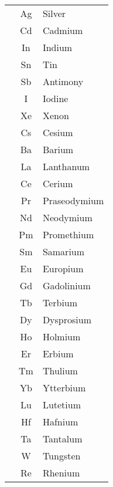 \documentclass{article}
\begin{document}
\begin{table}[h!]
\begin{minipage}{0.33\textwidth}
\begin{tabular}{>{\Rownum}ccl}
			             & Ag           & Silver           \\
			             & Cd           & Cadmium          \\
			             & In           & Indium           \\
			             & Sn           & Tin              \\
			             & Sb           & Antimony         \\
			             & I            & Iodine           \\
			             & Xe           & Xenon            \\
			             & Cs           & Cesium           \\
			             & Ba           & Barium           \\
			             & La           & Lanthanum        \\
			             & Ce           & Cerium           \\
			             & Pr           & Praseodymium     \\
			             & Nd           & Neodymium        \\
			             & Pm           & Promethium       \\
			             & Sm           & Samarium         \\
			             & Eu           & Europium         \\
			             & Gd           & Gadolinium       \\
			             & Tb           & Terbium          \\
			             & Dy           & Dysprosium       \\
			             & Ho           & Holmium          \\
			             & Er           & Erbium           \\
			             & Tm           & Thulium          \\
			             & Yb           & Ytterbium        \\
			             & Lu           & Lutetium         \\
			             & Hf           & Hafnium          \\
			             & Ta           & Tantalum         \\
			             & W            & Tungsten         \\
			             & Re           & Rhenium          \\

\end{tabular}
\end{minipage}
\end{table}
\end{document}
